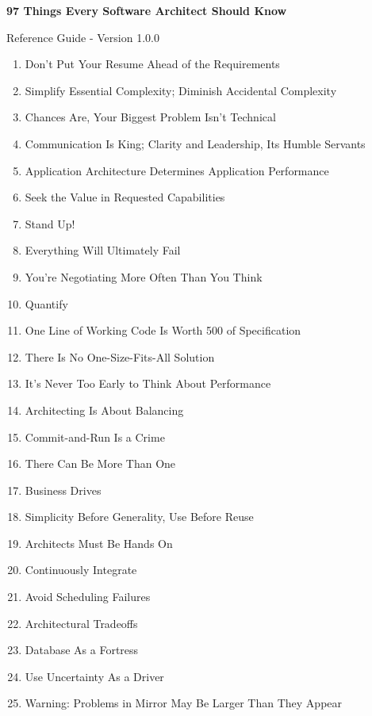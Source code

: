 \documentclass[10pt]{article}
\begin{document}
  \textbf{\LARGE 97 Things Every Software Architect Should Know}
  \par
  
  {
    \large
    Reference Guide - Version 1.0.0 
    \par
  }
  
  \begin{multicols}{4}
    \begin{enumerate}
      \itemsep -2pt
      \item Don't Put Your Resume Ahead of the Requirements 
      \item Simplify Essential Complexity; Diminish Accidental Complexity 
      \item Chances Are, Your Biggest Problem Isn't Technical 
      \item Communication Is King; Clarity and Leadership, Its Humble Servants 
      \item Application Architecture Determines Application Performance 
      \item Seek the Value in Requested Capabilities 
      \item Stand Up! 
      \item Everything Will Ultimately Fail 
      \item You're Negotiating More Often Than You Think 
      \item Quantify 
      \item One Line of Working Code Is Worth 500 of Specification 
      \item There Is No One-Size-Fits-All Solution 
      \item It's Never Too Early to Think About Performance 
      \item Architecting Is About Balancing 
      \item Commit-and-Run Is a Crime 
      \item There Can Be More Than One 
      \item Business Drives 
      \item Simplicity Before Generality, Use Before Reuse 
      \item Architects Must Be Hands On 
      \item Continuously Integrate 
      \item Avoid Scheduling Failures 
      \item Architectural Tradeoffs 
      \item Database As a Fortress 
      \item Use Uncertainty As a Driver 
      \item Warning: Problems in Mirror May Be Larger Than They Appear 

\end{enumerate}
\end{multicols}
\end{document}
